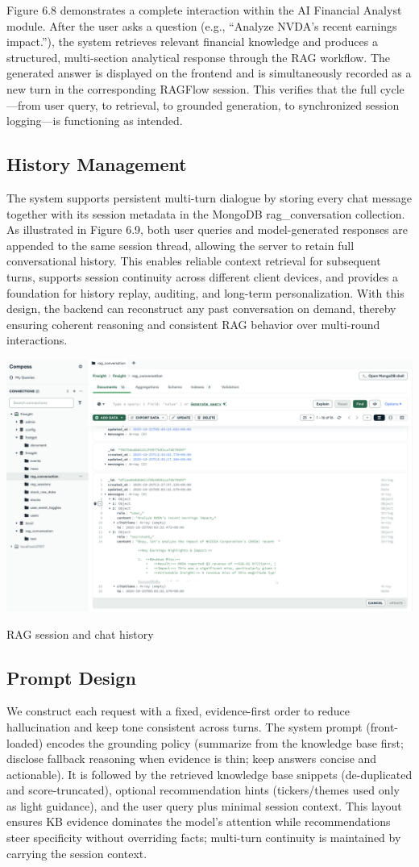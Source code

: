 Figure 6.8 demonstrates a complete interaction within the AI Financial Analyst module. After the user asks a question (e.g., “Analyze NVDA’s recent earnings impact.”), the system retrieves relevant financial knowledge and produces a structured, multi-section analytical response through the RAG workflow. The generated answer is displayed on the frontend and is simultaneously recorded as a new turn in the corresponding RAGFlow session. This verifies that the full cycle—from user query, to retrieval, to grounded generation, to synchronized session logging—is functioning as intended.


\subsection{History Management}
The system supports persistent multi-turn dialogue by storing every chat message together with its session metadata in the MongoDB rag\_conversation collection. As illustrated in Figure 6.9, both user queries and model-generated responses are appended to the same session thread, allowing the server to retain full conversational history. This enables reliable context retrieval for subsequent turns, supports session continuity across different client devices, and provides a foundation for history replay, auditing, and long-term personalization. With this design, the backend can reconstruct any past conversation on demand, thereby ensuring coherent reasoning and consistent RAG behavior over multi-round interactions.
\begin{center}
    \includegraphics[width=0.75\linewidth]{images/rag_session.png}
    \caption{RAG session and chat history}
\end{center}

\subsection{Prompt Design}
We construct each request with a fixed, evidence-first order to reduce hallucination and keep tone consistent across turns. The system prompt (front-loaded) encodes the grounding policy (summarize from the knowledge base first; disclose fallback reasoning when evidence is thin; keep answers concise and actionable). It is followed by the retrieved knowledge base snippets (de-duplicated and score-truncated), optional recommendation hints (tickers/themes used only as light guidance), and the user query plus minimal session context. This layout ensures KB evidence dominates the model’s attention while recommendations steer specificity without overriding facts; multi-turn continuity is maintained by carrying the session context.

